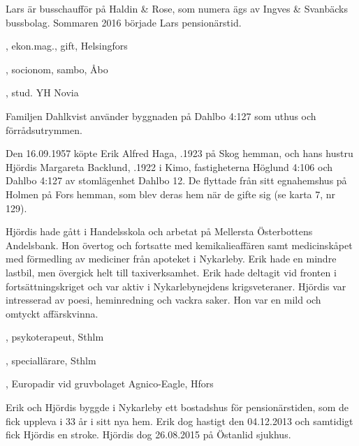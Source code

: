 Lars är busschaufför på Haldin \& Rose, som numera ägs av Ingves \& Svanbäcks bussbolag. Sommaren 2016 började Lars pensionärstid.
\begin{jhchildren}
  \item {}, ekon.mag., gift, Helsingfors
  \item {}, socionom, sambo, Åbo
  \item {}, stud. YH Novia
\end{jhchildren}
Familjen Dahlkvist använder byggnaden på Dahlbo 4:127 som	uthus och förrådsutrymmen.


%
Den 16.09.1957 köpte Erik Alfred Haga, .1923 på Skog	hemman, och hans hustru Hjördis Margareta Backlund, .1922 i Kimo, fastigheterna Höglund 4:106 och Dahlbo 4:127 av stomlägenhet Dahlbo 12. De flyttade från sitt egnahemshus på Holmen på	Fors hemman, som blev	deras hem när de gifte sig (se karta 7, nr 129).

Hjördis hade gått i	Handelsskola och arbetat på Mellersta Österbottens Andelsbank. Hon övertog och fortsatte med kemikalieaffären samt medicinskåpet med	förmedling av mediciner från apoteket i Nykarleby. Erik hade en mindre lastbil, men övergick helt till taxiverksamhet. Erik hade deltagit vid	fronten i fortsättningskriget och var aktiv i Nykarlebynejdens krigsveteraner. Hjördis var intresserad av poesi, heminredning och	vackra saker. Hon var en mild och omtyckt affärskvinna.
\begin{jhchildren}
  \item {}, psykoterapeut, Sthlm
  \item {}, speciallärare, Sthlm
  \item {}, Europadir vid  gruvbolaget Agnico-Eagle, Hfors
\end{jhchildren}
Erik och Hjördis byggde i Nykarleby ett bostadshus för pensionärstiden,	som de fick uppleva i 33 år i sitt nya hem. Erik dog hastigt den 04.12.2013 och samtidigt fick Hjördis en stroke. Hjördis dog 26.08.2015 på Östanlid sjukhus.


